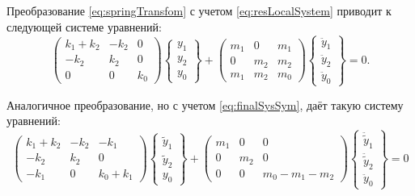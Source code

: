 Преобразование \eqref{eq:springTransfom} с учетом \eqref{eq:resLocalSystem} приводит к следующей системе уравнений:
\begin{equation}
	\begin{pmatrix}
		k_1+k_2 & -k_2 & 0 \\
		-k_2 & k_2 & 0 \\
		0 & 0 & k_0
	\end{pmatrix}
	\begin{Bmatrix}
		y_1 \\ y_2 \\ y_0
	\end{Bmatrix} +
	\begin{pmatrix}
		m_1 & 0 & m_1 \\
		0 & m_2 & m_2 \\
		m_1 & m_2 & m_0
	\end{pmatrix}
	\begin{Bmatrix}
		\ddot{y}_1 \\ \ddot{y}_2 \\ \ddot{y}_0
	\end{Bmatrix} = 0.
	\label{eq:springASymSys}
\end{equation}

Аналогичное преобразование, но с учетом \eqref{eq:finalSysSym}, даёт такую систему уравнений:
\begin{equation}
	\begin{pmatrix}
		k_1+k_2 & -k_2 & -k_1 \\
		-k_2 & k_2 & 0 \\
		-k_1 & 0 & k_0+k_1
	\end{pmatrix}
	\begin{Bmatrix}
		\tilde{y}_1 \\ \tilde{y}_2 \\ y_0
	\end{Bmatrix} +
	\begin{pmatrix}
		m_1 & 0 & 0 \\
		0 & m_2 & 0 \\
		0 & 0 & m_0 - m_1 - m_2
	\end{pmatrix}
	\begin{Bmatrix}
		\ddot{\tilde{y}}_1 \\ \ddot{\tilde{y}}_2 \\ \ddot{y}_0
	\end{Bmatrix} = 0
	\label{eq:springSymSys}
\end{equation}

